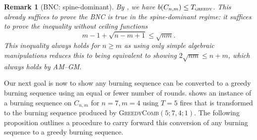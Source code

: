 \documentclass{article}
\newcommand{\gr}{\textsc{greedy}}
\newtheorem{remark}{Remark}
\begin{document}
\begin{remark}[BNC: spine-dominant]\label{rmk: bnc spine-dominant}
By , we have $b(C_{n,m}) \le T_{\gr}$. This already suffices to prove the BNC is true in the spine-dominant regime: it suffices to prove the inequality without ceiling functions
\[
m-1 + \sqrt{n-m+1} \le \sqrt{nm}.
\]
This inequality always holds for $n \ge m$ as using only simple algebraic manipulations reduces this to being equivalent to showing $2 \sqrt{nm} \le n + m$, which always holds by AM--GM.
\end{remark}


Our next goal is now to show any burning sequence can be converted to a greedy burning sequence using an equal or fewer number of rounds.  shows an instance of a burning sequence on $C_{n,m}$ for $n = 7,m=4$ using $T = 5$ fires that is transformed to the burning sequence produced by \textsc{GreedyComb}$(5; 7,4;1)$. The following proposition outlines a procedure to carry forward this conversion of any burning sequence to a greedy burning sequence.
\end{document}
